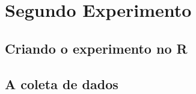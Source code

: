\chapter{Segundo Experimento}
\label{chap:segundo_experimento}


\section{Criando o experimento no R}
\label{sec:segundo_experimento_criando o experimento_no_R}


\section{A coleta de dados}
\label{sec:segundo_experimento_a_coleta_de_dados}

